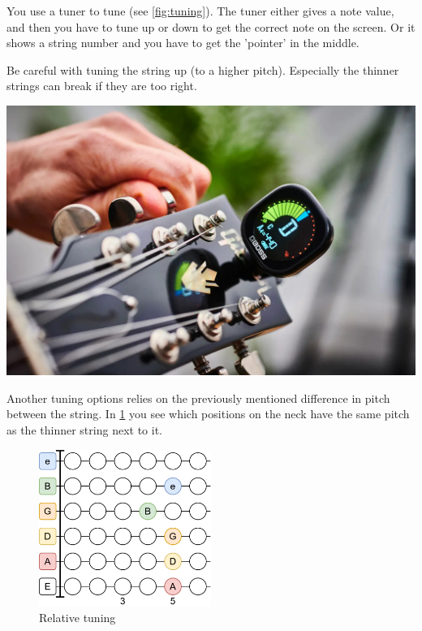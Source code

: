 \begin{minipage}{0.5\textwidth}
You use a tuner to tune (see \ref{fig:tuning}). The tuner either gives a note value, and then you have to tune up or down to get the correct note on the screen. Or it shows a string number and you have to get the 'pointer' in the middle.

Be careful with tuning the string up (to a higher pitch). Especially the thinner strings can break if they are too right.
\end{minipage}
\hfill
\begin{minipage}{0.34\textwidth}
    \centering
    \includegraphics[width=\textwidth]{image/guitar-tuning.jpg}
    \label{fig:tuning}
\end{minipage}

Another tuning options relies on the previously mentioned difference in pitch between the string. In \ref{fig:guitar_relative_tuning} you see which positions on the neck have the same pitch as the thinner string next to it.

\begin{figure}[h]
    \centering
    \includegraphics[width=0.5\textwidth]{image/GuitarRelativeTuning.png}
    \caption{Relative tuning}
    \label{fig:guitar_relative_tuning}
\end{figure}
